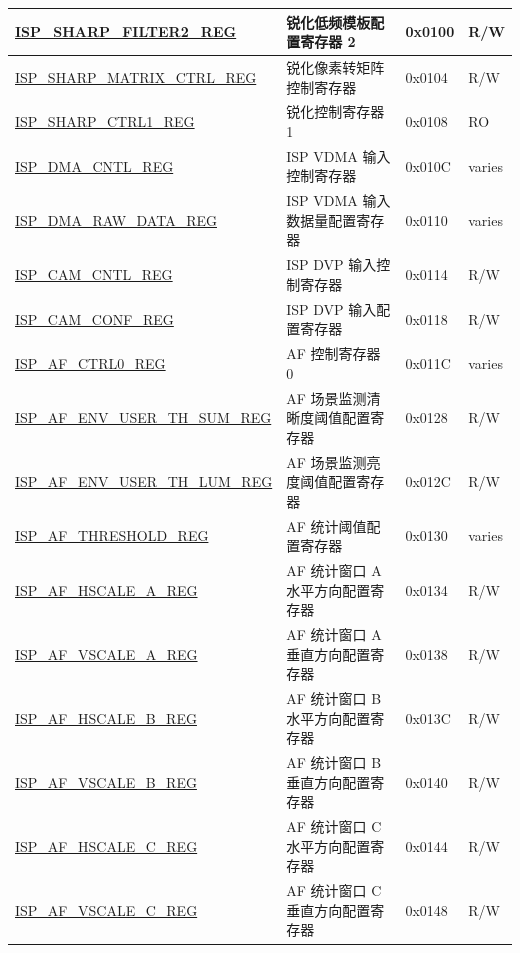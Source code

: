 \begin{longtable}{ | p{6cm} | p{7.2cm} | p{1.3cm} | p{1cm} | }
\hyperref[regdesc:ISPSHARPFILTER2REG]{ISP\_SHARP\_FILTER2\_REG} & 锐化低频模板配置寄存器 2 & 0x0100 & R/W \\ \hline
\hyperref[regdesc:ISPSHARPMATRIXCTRLREG]{ISP\_SHARP\_MATRIX\_CTRL\_REG} & 锐化像素转矩阵控制寄存器 & 0x0104 & R/W \\ \hline
\hyperref[regdesc:ISPSHARPCTRL1REG]{ISP\_SHARP\_CTRL1\_REG} & 锐化控制寄存器 1 & 0x0108 & RO \\ \hline
\hyperref[regdesc:ISPDMACNTLREG]{ISP\_DMA\_CNTL\_REG} & ISP VDMA 输入控制寄存器 & 0x010C & varies \\ \hline
\hyperref[regdesc:ISPDMARAWDATAREG]{ISP\_DMA\_RAW\_DATA\_REG} & ISP VDMA 输入数据量配置寄存器 & 0x0110 & varies \\ \hline
\hyperref[regdesc:ISPCAMCNTLREG]{ISP\_CAM\_CNTL\_REG} & ISP DVP 输入控制寄存器 & 0x0114 & R/W \\ \hline
\hyperref[regdesc:ISPCAMCONFREG]{ISP\_CAM\_CONF\_REG} & ISP DVP 输入配置寄存器 & 0x0118 & R/W \\ \hline
\hyperref[regdesc:ISPAFCTRL0REG]{ISP\_AF\_CTRL0\_REG} & AF 控制寄存器 0 & 0x011C & varies \\ \hline
\hyperref[regdesc:ISPAFENVUSERTHSUMREG]{ISP\_AF\_ENV\_USER\_TH\_SUM\_REG} & AF 场景监测清晰度阈值配置寄存器 & 0x0128 & R/W \\ \hline
\hyperref[regdesc:ISPAFENVUSERTHLUMREG]{ISP\_AF\_ENV\_USER\_TH\_LUM\_REG} & AF 场景监测亮度阈值配置寄存器 & 0x012C & R/W \\ \hline
\hyperref[regdesc:ISPAFTHRESHOLDREG]{ISP\_AF\_THRESHOLD\_REG} & AF 统计阈值配置寄存器 & 0x0130 & varies \\ \hline
\hyperref[regdesc:ISPAFHSCALEAREG]{ISP\_AF\_HSCALE\_A\_REG} & AF 统计窗口 A 水平方向配置寄存器 & 0x0134 & R/W \\ \hline
\hyperref[regdesc:ISPAFVSCALEAREG]{ISP\_AF\_VSCALE\_A\_REG} & AF 统计窗口 A 垂直方向配置寄存器 & 0x0138 & R/W \\ \hline
\hyperref[regdesc:ISPAFHSCALEBREG]{ISP\_AF\_HSCALE\_B\_REG} & AF 统计窗口 B 水平方向配置寄存器 & 0x013C & R/W \\ \hline
\hyperref[regdesc:ISPAFVSCALEBREG]{ISP\_AF\_VSCALE\_B\_REG} & AF 统计窗口 B 垂直方向配置寄存器 & 0x0140 & R/W \\ \hline
\hyperref[regdesc:ISPAFHSCALECREG]{ISP\_AF\_HSCALE\_C\_REG} & AF 统计窗口 C 水平方向配置寄存器 & 0x0144 & R/W \\ \hline
\hyperref[regdesc:ISPAFVSCALECREG]{ISP\_AF\_VSCALE\_C\_REG} & AF 统计窗口 C 垂直方向配置寄存器 & 0x0148 & R/W \\ \hline

\end{longtable}
